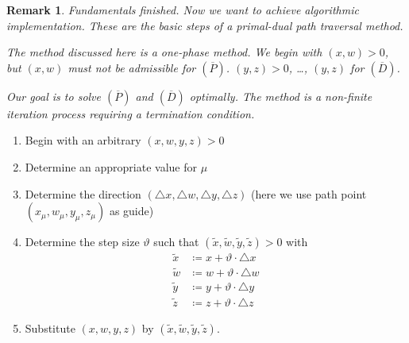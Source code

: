 \documentclass[a4paper]{article}
\numberwithin{lecref}{subsection}
\newtheorem*{Remark}{Remark}
\begin{document}
\begin{Remark}
	Fundamentals finished. Now we want to achieve algorithmic implementation.
	These are the basic steps of a primal-dual path traversal method.

	The method discussed here is a one-phase method.
	We begin with $(x, w) > 0$, but $(x, w)$ must not be admissible for $(\overline P)$.
	$(y, z) > 0$, \dots, $(y, z)$ for $(\overline D)$.

	Our goal is to solve $(\overline P)$ and $(\overline D)$ optimally.
	The method is a non-finite iteration process requiring a termination condition.
\end{Remark}

\begin{enumerate}
	\item[0.] Begin with an arbitrary $(x, w, y, z) > 0$
	\item[1.] Determine an appropriate value for $\mu$
	\item[2.] Determine the direction $(\triangle x, \triangle w, \triangle y, \triangle z)$ (here we use path point $(x_\mu, w_\mu, y_\mu, z_\mu)$ as guide)
	\item[3.] Determine the step size $\vartheta$ such that $(\tilde x, \tilde w, \tilde y, \tilde z) > 0$ with
		\begin{align*}
			\tilde x &\coloneqq x + \vartheta \cdot \triangle x \\
			\tilde w &\coloneqq w + \vartheta \cdot \triangle w \\
			\tilde y &\coloneqq y + \vartheta \cdot \triangle y \\
			\tilde z &\coloneqq z + \vartheta \cdot \triangle z
		\end{align*}
	\item[4.] Substitute $(x, w, y, z)$ by $(\tilde x, \tilde w, \tilde y, \tilde z)$.
\end{enumerate}
\end{document}
